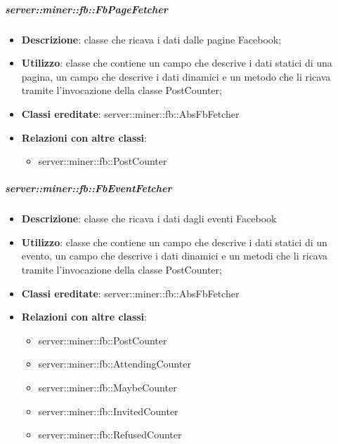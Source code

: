 		\subparagraph{server::miner::fb::FbPageFetcher} %
		\label{subp:server_miner_fb_FbPageFetcher}
			\begin{itemize}
				\item \textbf{Descrizione}: classe che ricava i dati dalle pagine Facebook;
				\item \textbf{Utilizzo}: classe che contiene un campo che descrive i dati statici di una pagina, un campo che descrive i dati dinamici e un metodo che li ricava tramite l'invocazione della classe PostCounter;
				\item \textbf{Classi ereditate}: server::miner::fb::AbsFbFetcher
				\item \textbf{Relazioni con altre classi}:
					\begin{itemize}
						\item server::miner::fb::PostCounter
					\end{itemize}
			\end{itemize}

		\subparagraph{server::miner::fb::FbEventFetcher} %
		\label{subp:server_miner_fb_FbEventFetcher}
			\begin{itemize}
				\item \textbf{Descrizione}: classe che ricava i dati dagli eventi Facebook
				\item \textbf{Utilizzo}: classe che contiene un campo che descrive i dati statici di un evento, un campo che descrive i dati dinamici e un metodi che li ricava tramite l'invocazione della classe PostCounter;
				\item \textbf{Classi ereditate}: server::miner::fb::AbsFbFetcher
				\item \textbf{Relazioni con altre classi}:
					\begin{itemize}
						\item server::miner::fb::PostCounter
						\item server::miner::fb::AttendingCounter
						\item server::miner::fb::MaybeCounter
						\item server::miner::fb::InvitedCounter
						\item server::miner::fb::RefusedCounter
					\end{itemize}
			\end{itemize}

